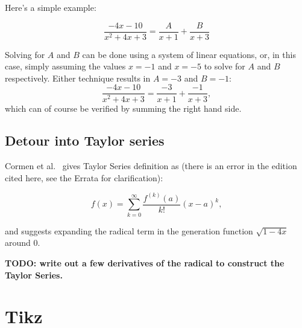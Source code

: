 \documentclass{article}
\begin{document}
Here's a simple example:

\begin{equation}
\frac{-4x-10}{x^2+4x+3} = \frac{A}{x+1} + \frac{B}{x+3}
\end{equation}

Solving for $A$ and $B$ can be done using a system of linear equations,
or, in this case, simply assuming the values $x = -1$ and $x = -5$
to solve for $A$ and $B$ respectively. Either technique results in $A = -3$ and
$B = -1$:
\begin{equation}
\frac{-4x-10}{x^2+4x+3} = \frac{-3}{x+1} + \frac{-1}{x+3},
\end{equation}
which can of course be verified by summing the right hand side.




\subsection{Detour into Taylor series}

Cormen et al.~\cite[p. 262]{cormen:th:1990} gives Taylor Series definition as
(there is an error in the edition cited here, see the Errata for clarification):

\begin{equation}
f(x) = \sum_{k=0}^{\infty} \frac{f^{(k)}(a)}{k!}(x-a)^k,
\end{equation}

and suggests expanding the radical term in the generation function
$\sqrt{1-4x}$ around $0$.

{\bf TODO: write out a few derivatives of the radical to construct
the Taylor Series.}

{}


\appendix

\section{Tikz}


\end{document}
